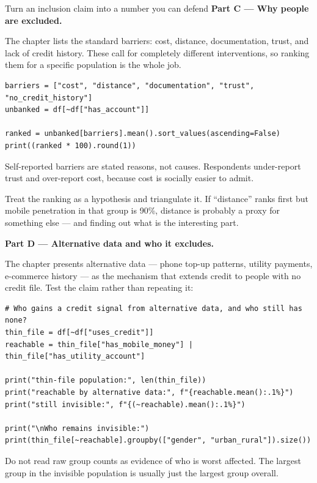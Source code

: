 \begin{labproject}{Turn an inclusion claim into a number you can defend}
\medskip\noindent\textbf{Part C --- Why people are excluded.}\par
The chapter lists the standard barriers: cost, distance, documentation, trust, and lack of credit history. These call for completely different interventions, so ranking them for a specific population is the whole job.

\begin{lstlisting}[style=mlpython]
barriers = ["cost", "distance", "documentation", "trust", "no_credit_history"]
unbanked = df[~df["has_account"]]

ranked = unbanked[barriers].mean().sort_values(ascending=False)
print((ranked * 100).round(1))
\end{lstlisting}

\begin{pitfall}
Self-reported barriers are stated reasons, not causes. Respondents under-report trust and over-report cost, because cost is socially easier to admit.

Treat the ranking as a hypothesis and triangulate it. If ``distance'' ranks first but mobile penetration in that group is 90\%, distance is probably a proxy for something else --- and finding out what is the interesting part.
\end{pitfall}

\medskip\noindent\textbf{Part D --- Alternative data and who it excludes.}\par
The chapter presents alternative data --- phone top-up patterns, utility payments, e-commerce history --- as the mechanism that extends credit to people with no credit file. Test the claim rather than repeating it:

\begin{lstlisting}[style=mlpython]
# Who gains a credit signal from alternative data, and who still has none?
thin_file = df[~df["uses_credit"]]
reachable = thin_file["has_mobile_money"] | thin_file["has_utility_account"]

print("thin-file population:", len(thin_file))
print("reachable by alternative data:", f"{reachable.mean():.1%}")
print("still invisible:", f"{(~reachable).mean():.1%}")

print("\nWho remains invisible:")
print(thin_file[~reachable].groupby(["gender", "urban_rural"]).size())
\end{lstlisting}

\begin{pitfall}
Do not read raw group counts as evidence of who is worst affected. The largest group in the invisible population is usually just the largest group overall.


\end{pitfall}
\end{labproject}
